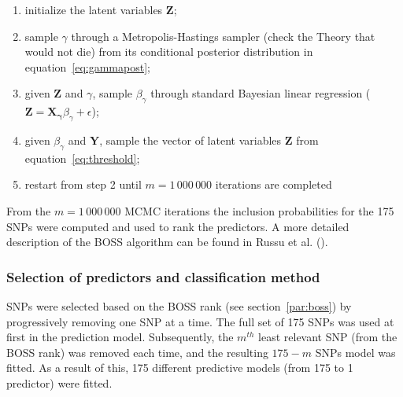 \begin{enumerate}
\item initialize the latent variables $\mathbf{Z}$;
\item sample $\gamma$ through a Metropolis-Hastings sampler (check the
  Theory that would not die) from its conditional posterior distribution
  in equation~\ref{eq:gammapost};
\item given $\mathbf{Z}$ and $\gamma$, sample $\beta_{\gamma}$ through
  standard Bayesian linear regression ($\mathbf{Z}=\mathbf{X_{\gamma}}\beta_{\gamma}+\epsilon$);
\item given $\beta_{\gamma}$ and $\mathbf{Y}$, sample the vector of latent
  variables $\mathbf{Z}$ from equation~\ref{eq:threshold};
\item restart from step 2 until $m=1\,000\,000$ iterations are completed
\end{enumerate}

From the $m=1\,000\,000$ MCMC iterations the inclusion probabilities for
the 175 SNPs were computed and used to rank the predictors.
A more detailed description of the BOSS algorithm can be found in Russu
et al. (\cite{russu2012stochastic}).



\subsubsection{Selection of predictors and classification method}
\label{par:predictor_selection}

SNPs were selected based on the BOSS rank (see section~\ref{par:boss})
by progressively removing one SNP at a time. The full set of 175 SNPs
was used at first in the prediction model. Subsequently, the $m^{th}$ least
relevant SNP (from the BOSS rank) was removed each time, and the
resulting $175-m$ SNPs model was fitted. As a result of this, 175
different predictive models (from 175 to 1 predictor) were fitted.

